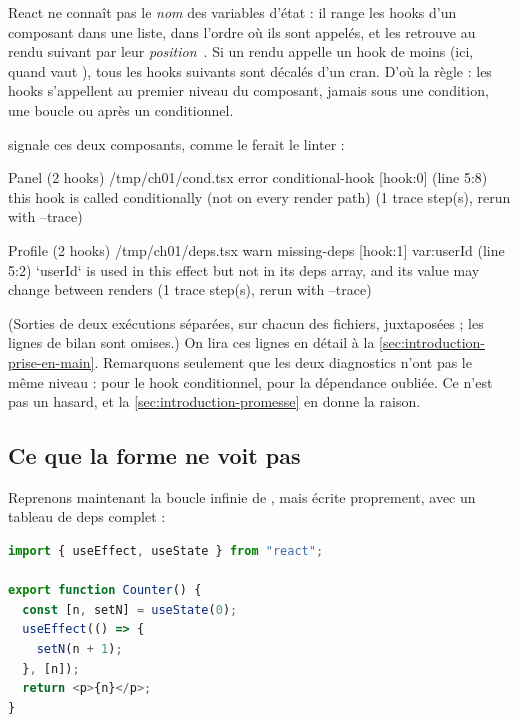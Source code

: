\begin{react}
  React ne connaît pas le \emph{nom} des variables d'état : il range les hooks
  d'un composant dans une liste, dans l'ordre où ils sont appelés, et les
  retrouve au rendu suivant par leur \emph{position}~\cite{ReactRulesOfHooks}.
  Si un rendu appelle un hook de moins (ici, quand  vaut
  ), tous les hooks suivants sont décalés d'un cran. D'où la règle :
  les hooks s'appellent au premier niveau du composant, jamais sous une
  condition, une boucle ou après un  conditionnel.
\end{react}

\reactant{} signale ces deux composants, comme le ferait le linter :

\begin{sortie}
  Panel  (2 hooks)  /tmp/ch01/cond.tsx
    error  conditional-hook  [hook:0]  (line 5:8)  this hook is called conditionally (not on every render path)
       (1 trace step(s), rerun with --trace)

  Profile  (2 hooks)  /tmp/ch01/deps.tsx
    warn   missing-deps  [hook:1]  var:userId  (line 5:2)  `userId` is used in this effect but not in its deps array, and its value may change between renders
       (1 trace step(s), rerun with --trace)
\end{sortie}

(Sorties de deux exécutions séparées,  sur chacun des
fichiers, juxtaposées ; les lignes de bilan sont omises.) On lira ces lignes en
détail à la \cref{sec:introduction-prise-en-main}. Remarquons seulement que les
deux diagnostics n'ont pas le même niveau :  pour le hook
conditionnel,  pour la dépendance oubliée. Ce n'est pas un hasard,
et la \cref{sec:introduction-promesse} en donne la raison.

\subsection{Ce que la forme ne voit pas}

Reprenons maintenant la boucle infinie de , mais écrite
\og proprement\fg{}, avec un tableau de deps complet :

\begin{lstlisting}[language=TypeScript,caption={\code{Counter} avec des deps complètes (\file{/tmp/ch01/deps_ok.tsx})},label={lst:introduction-deps-ok}]
import { useEffect, useState } from "react";

export function Counter() {
  const [n, setN] = useState(0);
  useEffect(() => {
    setN(n + 1);
  }, [n]);
  return <p>{n}</p>;
}
\end{lstlisting}

